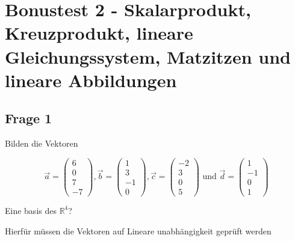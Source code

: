 \chapter{Bonustest 2 - Skalarprodukt, Kreuzprodukt, lineare Gleichungssystem, Matzitzen und lineare Abbildungen}

\section{Frage 1}

Bilden die Vektoren

\[
    \vec{a} = \begin{pmatrix}
        6 \\ 0 \\ 7 \\ -7
    \end{pmatrix}, \vec{b} = \begin{pmatrix}
        1 \\3 \\ -1 \\ 0
    \end{pmatrix}, \vec{c} = \begin{pmatrix}
        -2 \\ 3 \\ 0 \\ 5
    \end{pmatrix} \text{ und } \vec{d} = \begin{pmatrix}
        1 \\ -1 \\ 0 \\ 1
    \end{pmatrix}
\]

Eine basis des $\mathbb{R}^4$?

Hierfür müssen die Vektoren auf Lineare unabhängigkeit geprüft werden

